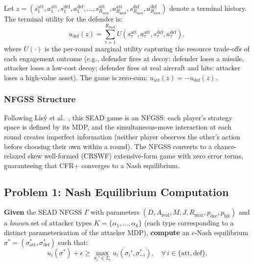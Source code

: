 \documentclass[sigconf]{aamas}
\newcommand{\pdeceive}{p_{\mathrm{dec}}}
\newcommand{\phit}{p_{\mathrm{hit}}}
\begin{document}
Let $z = (s_1^{\mathrm{att}}, a_1^{\mathrm{att}}, s_1^{\mathrm{def}}, a_1^{\mathrm{def}}, \ldots, s_{R_{\max}}^{\mathrm{att}}, a_{R_{\max}}^{\mathrm{att}}, s_{R_{\max}}^{\mathrm{def}}, a_{R_{\max}}^{\mathrm{def}})$ denote a terminal history. The terminal utility for the defender is:
\begin{equation}
    u_{\mathrm{def}}(z) = \sum_{\tau=1}^{R_{\max}} U\!\left(s_\tau^{\mathrm{att}}, a_\tau^{\mathrm{att}}, s_\tau^{\mathrm{def}}, a_\tau^{\mathrm{def}}\right),
    \label{eq:terminal_utility}
\end{equation}
where $U(\cdot)$ is the per-round marginal utility capturing the resource trade-offs of each engagement outcome (e.g., defender fires at decoy: defender loses a missile, attacker loses a low-cost decoy; defender fires at real aircraft and hits: attacker loses a high-value asset). The game is zero-sum: $u_{\mathrm{att}}(z) = -u_{\mathrm{def}}(z)$.

\subsubsection{NFGSS Structure}
Following Lis\'{y} et al.~\cite{Lisy2016}, this SEAD game is an NFGSS: each player's strategy space is defined by its MDP, and the simultaneous-move interaction at each round creates imperfect information (neither player observes the other's action before choosing their own within a round). The NFGSS converts to a chance-relaxed skew well-formed (CRSWF) extensive-form game with zero error terms, guaranteeing that CFR+ converges to a Nash equilibrium.

\subsection{Problem 1: Nash Equilibrium Computation}
\label{sec:problem1}

\textbf{Given} the SEAD NFGSS $\Gamma$ with parameters $(D, A_{\mathrm{real}}, M, J, R_{\max}, \pdeceive, \phit)$ and a \emph{known} set of attacker types $K = \{\alpha_1, \ldots, \alpha_k\}$ (each type corresponding to a distinct parameterisation of the attacker MDP), \textbf{compute} an $\epsilon$-Nash equilibrium $\sigma^* = (\sigma_{\mathrm{att}}^*, \sigma_{\mathrm{def}}^*)$ such that:
\begin{equation}
    u_i(\sigma^*) + \epsilon \geq \max_{\sigma_i' \in \Sigma_i} u_i(\sigma_i', \sigma_{-i}^*), \quad \forall \, i \in \{\mathrm{att}, \mathrm{def}\}.
    \label{eq:problem1}
\end{equation}
\end{document}
